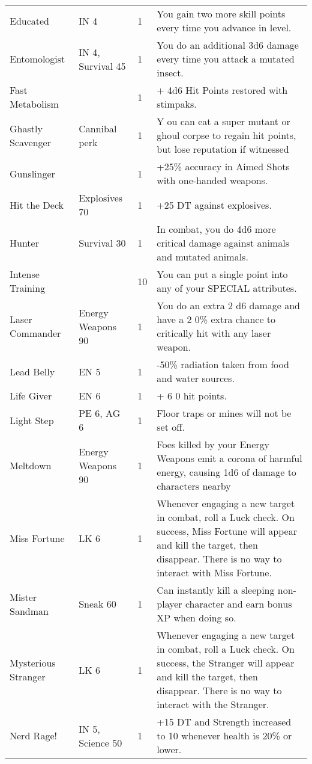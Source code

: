 \documentclass{report}
\begin{document}
\begin{table}[H]
\begin{tabular}{p{30mm}p{30mm}p{30mm}p{30mm}}
Educated  & IN 4  & 1  & You gain two more skill points every time you advance in level.  \\
Entomologist  & IN 4, Survival 45  & 1  & You do an additional  3d6  damage every time you attack a mutated insect.  \\
Fast Metabolism  &  & 1  & + 4d6  Hit Points restored with stimpaks.  \\
Ghastly Scavenger  & Cannibal perk  & 1  & Y ou  can  eat a super mutant or ghoul corpse to regain hit points, but lose  reputation  if witnessed   \\
Gunslinger  &  & 1  & +25\% accuracy in  Aimed Shots  with one-handed weapons.  \\
Hit the Deck  & Explosives 70  & 1  & +25 DT against explosives.  \\
Hunter  & Survival 30  & 1  & In combat, you do  4d6  more critical damage against animals and mutated animals.  \\
Intense Training  &  & 10  & You can put a single point into any of your SPECIAL attributes.  \\
Laser Commander  & Energy Weapons 90  & 1  & You do an extra  2 d6  damage and have a  2 0\% extra chance to critically hit with any laser weapon.  \\
Lead Belly  & EN 5  & 1  & -50\% radiation taken from food and water sources.  \\
Life Giver  & EN 6  & 1  & + 6 0 hit points.  \\
Light Step  & PE 6, AG 6  & 1  & Floor traps or mines will not be set off.  \\
Meltdown  & Energy Weapons 90  & 1  & Foes killed by your Energy Weapons emit a corona of harmful energy,  causing 1d6 of damage to characters nearby   \\
Miss Fortune  & LK 6  & 1  & Whenever engaging a new target in combat, roll a Luck check. On success, Miss Fortune will appear and kill the target, then disappear. There is no way to interact with Miss Fortune. \\
Mister Sandman  & Sneak 60  & 1  & Can instantly kill a sleeping non-player character and earn bonus XP when doing so.  \\
Mysterious Stranger  & LK 6  & 1  & Whenever engaging a new target in combat, roll a Luck check. On success, the Stranger will appear and kill the target, then disappear. There is no way to interact with the Stranger. \\
Nerd Rage!  & IN 5, Science 50  & 1  & +15 DT and Strength increased to 10 whenever health is 20\% or lower.  \\

\end{tabular}
\end{table}
\end{document}
